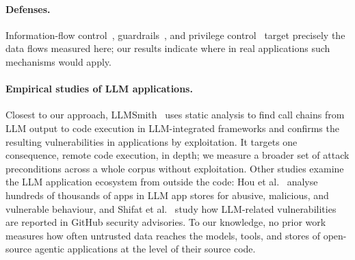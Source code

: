 \paragraph{Defenses.} Information-flow control~\cite{debenedetti2025camel,costa2025fides}, guardrails~\cite{llamafirewall,xiang2024guardagent}, and privilege control~\cite{shi2025progent} target precisely the data flows measured here; our results indicate where in real applications such mechanisms would apply.

\paragraph{Empirical studies of LLM applications.} Closest to our approach, LLMSmith~\cite{liu2024llmsmith} uses static analysis to find call chains from LLM output to code execution in LLM-integrated frameworks and confirms the resulting vulnerabilities in applications by exploitation. It targets one consequence, remote code execution, in depth; we measure a broader set of attack preconditions across a whole corpus without exploitation. Other studies examine the LLM application ecosystem from outside the code: Hou et al.~\cite{hou2024llmappstores} analyse hundreds of thousands of apps in LLM app stores for abusive, malicious, and vulnerable behaviour, and Shifat et al.~\cite{shifat2026advisories} study how LLM-related vulnerabilities are reported in GitHub security advisories. To our knowledge, no prior work measures how often untrusted data reaches the models, tools, and stores of open-source agentic applications at the level of their source code.